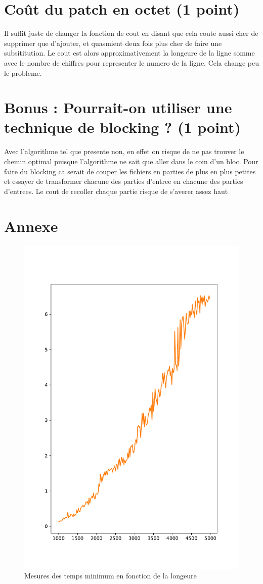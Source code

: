\documentclass[a4paper,10pt,french]{article}
\begin{document}
\section{Coût du patch en octet (1 point)}
Il suffit juste de changer la fonction de cout en disant que cela coute aussi cher de supprimer que d'ajouter, et quasmient deux fois plus cher de faire une subsititution. Le cout est alors approximativement la longeure de la ligne somme avec le nombre de chiffres pour representer le numero de la ligne. Cela change peu le probleme.
\section{Bonus : Pourrait-on utiliser une technique de blocking ? (1 point)}
Avec l'algorithme tel que presente non, en effet on risque de ne pas trouver le chemin optimal puisque l'algorithme ne sait que aller dans le coin d'un bloc. Pour faire du blocking ca serait de couper les fichiers en parties de plus en plus petites et essayer de transformer chacune des parties d'entree en chacune des parties d'entrees. Le cout de recoller chaque partie risque de s'averer assez haut

\section*{Annexe}

    \begin{figure}[h]
      \begin{center}
		  \includegraphics{rapport/cost.pdf}
		  \caption{Mesures des temps minimum en fonction de la longeure}
		  \label{graph-temps}
      \end{center}
    \end{figure}
\end{document}
